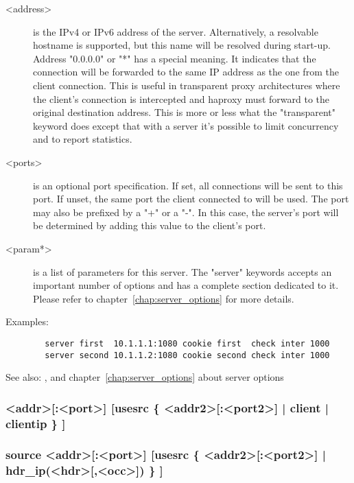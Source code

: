 {\begin{description}
  \item[<address>] is the IPv4 or IPv6 address of the server. Alternatively, a
              resolvable hostname is supported, but this name will be resolved
              during start-up. Address "0.0.0.0" or "*" has a special meaning.
              It indicates that the connection will be forwarded to the same IP
              address as the one from the client connection. This is useful in
              transparent proxy architectures where the client's connection is
              intercepted and haproxy must forward to the original destination
              address. This is more or less what the "transparent" keyword does
              except that with a server it's possible to limit concurrency and
              to report statistics.

   \item[<ports>] is an optional port specification. If set, all connections will
              be sent to this port. If unset, the same port the client
              connected to will be used. The port may also be prefixed by a "+"
              or a "-". In this case, the server's port will be determined by
              adding this value to the client's port.

  \item[<param*>] is a list of parameters for this server. The "server" keywords
              accepts an important number of options and has a complete section
              dedicated to it. Please refer to chapter~\ref{chap:server_options} for more details.
  \end{description}

  Examples:
  \begin{verbatim}
        server first  10.1.1.1:1080 cookie first  check inter 1000
        server second 10.1.1.2:1080 cookie second check inter 1000
  \end{verbatim}

  See also: ,  and chapter~\ref{chap:server_options} about
             server options

\subsubsection[source]{ <addr>[:<port>] [usesrc \{ <addr2>[:<port2>] | client | clientip \} ]}
\subsubsection*{source <addr>[:<port>] [usesrc \{ <addr2>[:<port2>] | hdr\_ip(<hdr>[,<occ>]) \} ]}
}

